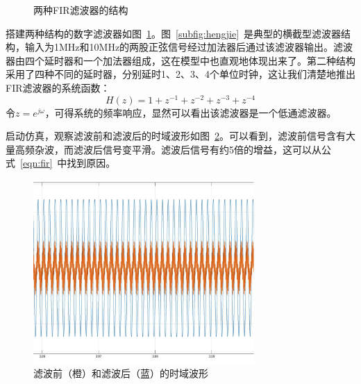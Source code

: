 \documentclass[lang=cn,newtx,10pt,scheme=chinese]{elegantbook}
\begin{document}
\begin{figure}[htbp]
  \hfill
  \caption{两种FIR滤波器的结构}
  \label{fig:exp4:simulink}
\end{figure}
搭建两种结构的数字滤波器如图~\ref{fig:exp4:simulink}。图~\ref{subfig:hengjie}~是典型的横截型滤波器结构，输入为1MHz和10MHz的两股正弦信号经过加法器后通过该滤波器输出。滤波器由四个延时器和一个加法器组成，这在模型中也直观地体现出来了。第二种结构采用了四种不同的延时器，分别延时1、2、3、4个单位时钟，这让我们清楚地推出FIR滤波器的系统函数：
\begin{equation}\label{eqn:fir}
  H(z) = 1 + z^{-1} + z^{-2} +z^{-3} +z^{-4}
\end{equation}
令$z = e^{j\omega}$，可得系统的频率响应，显然可以看出该滤波器是一个低通滤波器。

启动仿真，观察滤波前和滤波后的时域波形如图~\ref{fig:exp4:scope}。可以看到，滤波前信号含有大量高频杂波，而滤波后信号变平滑。滤波后信号有约5倍的增益，这可以从公式~\ref{eqn:fir}~中找到原因。

\begin{figure}[htbp]
  \centering
  \includegraphics[width = 0.75\textwidth]{figure/exp4/scope.pdf}
  \caption{滤波前（橙）和滤波后（蓝）的时域波形}
  \label{fig:exp4:scope}  
\end{figure}
\end{document}
